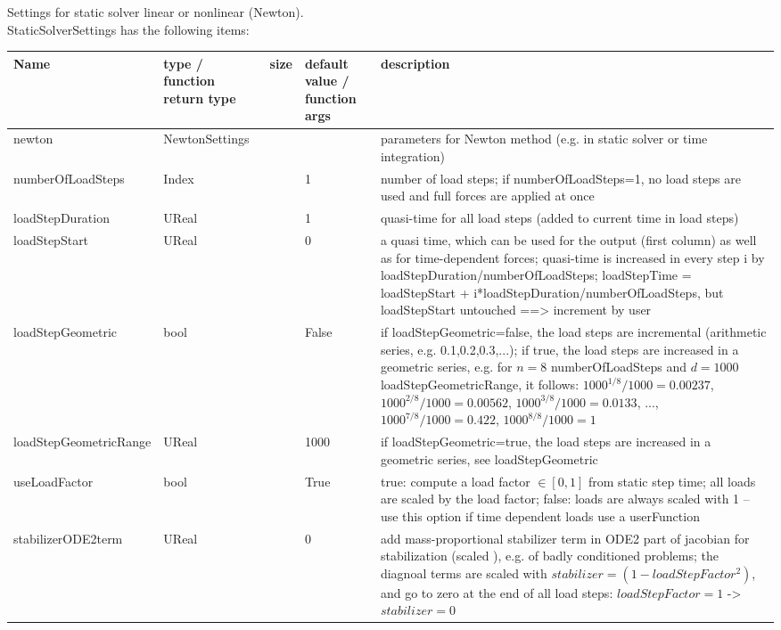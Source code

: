 \label{sec:StaticSolverSettings}
Settings for static solver linear or nonlinear (Newton).\\ 
%
StaticSolverSettings has the following items:
\begin{center}
  \footnotesize
  \begin{longtable}{| p{4.2cm} | p{2.5cm} | p{0.3cm} | p{3.0cm} | p{6cm} |}
    \hline
    \bf Name & \bf type / function return type & \bf size & \bf default value / function args & \bf description \\ \hline
    newton &     NewtonSettings &      &      &     parameters for Newton method (e.g. in static solver or time integration)\\ \hline
    numberOfLoadSteps &     Index &      &     1 &     number of load steps; if numberOfLoadSteps=1, no load steps are used and full forces are applied at once\\ \hline
    loadStepDuration &     UReal &      &     1 &     quasi-time for all load steps (added to current time in load steps)\\ \hline
    loadStepStart &     UReal &      &     0 &     a quasi time, which can be used for the output (first column) as well as for time-dependent forces; quasi-time is increased in every step i by loadStepDuration/numberOfLoadSteps; loadStepTime = loadStepStart + i*loadStepDuration/numberOfLoadSteps, but loadStepStart untouched ==> increment by user\\ \hline
    loadStepGeometric &     bool &      &     False &     if loadStepGeometric=false, the load steps are incremental (arithmetic series, e.g. 0.1,0.2,0.3,...); if true, the load steps are increased in a geometric series, e.g. for $n=8$ numberOfLoadSteps and $d = 1000$ loadStepGeometricRange, it follows: $1000^{1/8}/1000=0.00237$, $1000^{2/8}/1000=0.00562$, $1000^{3/8}/1000=0.0133$, ..., $1000^{7/8}/1000=0.422$, $1000^{8/8}/1000=1$\\ \hline
    loadStepGeometricRange &     UReal &      &     1000 &     if loadStepGeometric=true, the load steps are increased in a geometric series, see loadStepGeometric\\ \hline
    useLoadFactor &     bool &      &     True &     true: compute a load factor $\in [0,1]$ from static step time; all loads are scaled by the load factor; false: loads are always scaled with 1 -- use this option if time dependent loads use a userFunction\\ \hline
    stabilizerODE2term &     UReal &      &     0 &     add mass-proportional stabilizer term in ODE2 part of jacobian for stabilization (scaled ), e.g. of badly conditioned problems; the diagnoal terms are scaled with $stabilizer = (1-loadStepFactor^2)$, and go to zero at the end of all load steps: $loadStepFactor=1$ -> $stabilizer = 0$\\ \hline

\end{longtable}
\end{center}
